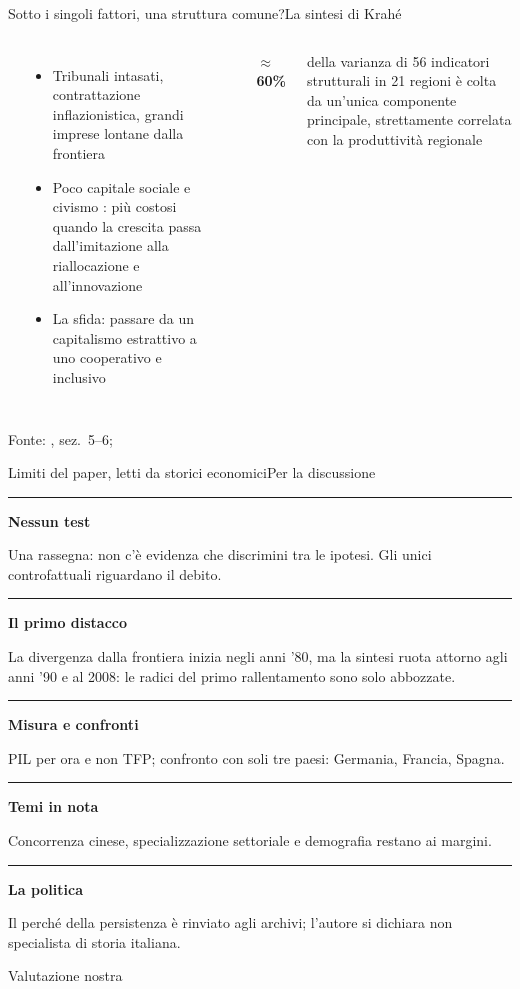 \documentclass[aspectratio=169,10pt]{beamer}
\newcommand{\fonte}[1]{\vfill{\tiny\color{muted}#1\par}}
\newcommand{\hugenum}[1]{{\color{accent}\fontsize{28}{32}\selectfont\bfseries #1}}
\newcommand{\cardrule}{{\color{ink}\rule{\linewidth}{0.8pt}}\par\vspace{0.4em}}
\newcommand{\riga}[2]{{\color{rulegray}\rule{\linewidth}{0.5pt}}\par\vspace{0.1em}%
  \begin{minipage}[t]{0.25\linewidth}\raggedright\small\leavevmode\color{ink}\bfseries #1\end{minipage}\hfill
  \begin{minipage}[t]{0.72\linewidth}\raggedright\small #2\end{minipage}\par\vspace{0.35em}}
\begin{document}
\begin{frame}{Sotto i singoli fattori, una struttura comune?}{La sintesi di Krahé}
  \begin{columns}[c]
    \cardrule{\color{ink}\bfseries Radici negli anni ’70–’80\par}
    \small
    \begin{itemize}
      \item Tribunali intasati, contrattazione inflazionistica, grandi imprese lontane dalla frontiera
      \item Poco capitale sociale e civismo \citep{putnam1993}: più costosi quando la crescita passa dall’imitazione alla riallocazione e all’innovazione
      \item La sfida: passare da un capitalismo estrattivo a uno cooperativo e inclusivo
    \end{itemize}
    \cardrule
    \hugenum{$\approx$\,60\%}\par\vspace{0.4em}
    {\small della varianza di 56 indicatori strutturali in 21 regioni è colta da un’unica componente principale, strettamente correlata con la produttività regionale \citep{imf2022b}\par}
  \end{columns}
  \fonte{Fonte: \citet{krahe2023}, sez.~5–6; \citet{imf2022b}}
\end{frame}

\begin{frame}{Limiti del paper, letti da storici economici}{Per la discussione}
  \vspace{0.4em}
  \riga{Nessun test}{Una rassegna: non c’è evidenza che discrimini tra le ipotesi. Gli unici controfattuali riguardano il debito.}
  \riga{Il primo distacco}{La divergenza dalla frontiera inizia negli anni ’80, ma la sintesi ruota attorno agli anni ’90 e al 2008: le radici del primo rallentamento sono solo abbozzate.}
  \riga{Misura e confronti}{PIL per ora e non TFP; confronto con soli tre paesi: Germania, Francia, Spagna.}
  \riga{Temi in nota}{Concorrenza cinese, specializzazione settoriale e demografia restano ai margini.}
  \riga{La politica}{Il perché della persistenza è rinviato agli archivi; l’autore si dichiara non specialista di storia italiana.}
  \fonte{Valutazione nostra}
\end{frame}
\end{document}
